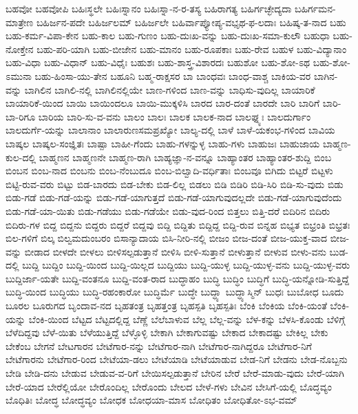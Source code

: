 {ಬಹವೋ
ಬಹವೋಪಿ
ಬಹಿಃಸ್ಥಲೇ
ಬಹಿಃಸ್ನಾನಂ
ಬಹಿಃಸ್ನಾ-ನ-ರ-ತಸ್ಯ
ಬಹಿರಾಗತ್ಯ
ಬಹಿರ್ಗಚ್ಛೇದ್ಯದಾ
ಬಹಿರ್ಗಮನ-ಮಾತ್ರೇಣ
ಬಹಿರ್ಜನ-ಪದೇ
ಬಹಿರ್ಜಲಮ್
ಬಹಿರ್ಜಲೇ
ಬಹಿರ್ವಾಪ್ಯೋಪ್ಯ-ವಭೃಥ-ಫ-ಲದಾಃ
ಬಹಿಷ್ಕ-ತ-ನಾದ
ಬಹು
ಬಹು-ಕರ್ಮ-ವಿಪಾ-ಕೇನ
ಬಹು-ಕಾಲ
ಬಹು-ಗುಣಂ
ಬಹು-ದುಃಖ-ವನ್ನು
ಬಹು-ದುಃಖ-ಸಮಾ-ಕುಲೌ
ಬಹುಧಾ
ಬಹು-ನೋಕ್ತೇನ
ಬಹು-ಪರಿ-ಯಾಗಿ
ಬಹು-ಬೀಜೇನ
ಬಹು-ಮಾನಂ
ಬಹು-ರೂಪಕಾಃ
ಬಹು-ರೇವ
ಬಹುಳ
ಬಹು-ವಿದ್ಯಾನಾಂ
ಬಹು-ವಿಧಾ
ಬಹು-ವಿಧಾನ್
ಬಹು-ವಿಧೈಃ
ಬಹುಶಃ
ಬಹು-ಶಾಸ್ತ್ರ-ವಿಶಾರದಃ
ಬಹುಶೋ
ಬಹು-ಶೋ-ಽಥ
ಬಹು-ಶೋ-ಽಮುನಾ
ಬಹು-ಹಿಂಸಾ-ಯು-ತೇನ
ಬಹೂನಿ
ಬಹ್ಮ-ರಾಕ್ಷಸರ
ಬಾ
ಬಾಂಧವಃ
ಬಾಂಧ-ವಾಶ್ಚ
ಬಾಕಿಯ-ವರ
ಬಾಗಿನ-ವನ್ನು
ಬಾಗಿಲಿನ
ಬಾಗಿಲಿ-ನಲ್ಲಿ
ಬಾಗಿಲಿನಲ್ಲಿಯೇ
ಬಾಣ-ಗಳಿಂದ
ಬಾಣ-ವನ್ನು
ಬಾಧಿಸು-ವುದಿಲ್ಲ
ಬಾಯಾರಿಕೆ
ಬಾಯಾರಿಕೆ-ಯಿಂದ
ಬಾಯಿ
ಬಾಯಿಂದಲೂ
ಬಾಯಿ-ಮುಕ್ಕಳಿಸಿ
ಬಾರದ
ಬಾರ-ದಂತೆ
ಬಾರದೇ
ಬಾರಿ
ಬಾರಿಗೆ
ಬಾರಿ-ಬಾ-ರಿಗೂ
ಬಾರಿಯ
ಬಾರಿ-ಸು-ವ-ವನು
ಬಾಲಂ
ಬಾಲಃ
ಬಾಲಕ
ಬಾಲಕ-ನಾದ
ಬಾಲಘ್ನ್ಯಃ
ಬಾಲದುರ್ಗಾಂ
ಬಾಲದುರ್ಗೆ-ಯನ್ನು
ಬಾಲಾನಾಂ
ಬಾಲಾರುಣಸಮಪ್ರಖ್ಯೋ
ಬಾಲ್ಯ-ದಲ್ಲಿ
ಬಾಳೆ
ಬಾಳೆ-ಯಕಂಭ-ಗಳಿಂದ
ಬಾವಿಯ
ಬಾಷ್ಕಲ
ಬಾಷ್ಕಲ-ಸಂಜ್ಞಿತಃ
ಬಾಷ್ಪಾ
ಬಾಹೀ-ಗೆಂದು
ಬಾಹು-ಗಳನ್ನುಳ್ಳ
ಬಾಹು-ಗಳು
ಬಾಹುಜಃ
ಬಾಹುಜಾಯ
ಬಾಹ್ಮಣ-ಕುಲ-ದಲ್ಲಿ
ಬಾಹ್ಮಣನ
ಬಾಹ್ಮಣನೇ
ಬಾಹ್ಮಣ-ರಾಗಿ
ಬಾಹ್ಯಜ್ಞಾ-ನ-ವನ್ನೂ
ಬಾಹ್ಯಾಂತರ
ಬಾಹ್ಯಾಂತರ-ಶುದ್ದಿ
ಬಿಂಬ
ಬಿಂಬನ
ಬಿಂಬ-ನಾದ
ಬಿಂಬನು
ಬಿಂಬ-ನೆಂಬುದೂ
ಬಿಂಬ-ಬಿಲ್ವಾದಿ-ವರ್ಧಿತಾಃ
ಬಿಂಬವೂ
ಬಿಗಿದು
ಬಿಟ್ಟರೆ
ಬಿಟ್ಟಳು
ಬಿಟ್ಟಿ-ರುವ-ವರು
ಬಿಟ್ಟು
ಬಿಡ-ಬಾರದು
ಬಿಡ-ಬೇಕು
ಬಿಡ-ಲಿಲ್ಲ
ಬಿಡಲು
ಬಿಡಿ
ಬಿಡಿರಿ
ಬಿಡಿ-ಸಿರಿ
ಬಿಡಿ-ಸು-ವುದು
ಬಿಡು
ಬಿಡು-ಗಡೆ
ಬಿಡು-ಗಡೆ-ಯನ್ನು
ಬಿಡು-ಗಡೆ-ಯಾಗುತ್ತದೆ
ಬಿಡು-ಗಡೆ-ಯಾಗುವುದಲ್ಲದೇ
ಬಿಡು-ಗಡೆ-ಯಾಗುವುದೆಂದು
ಬಿಡು-ಗಡೆ-ಯಾ-ಯಿತು
ಬಿಡು-ಗಡೆಯು
ಬಿಡು-ಗಡೆಯೇ
ಬಿಡು-ವುದ-ರಿಂದ
ಬಿತ್ತಲು
ಬಿತ್ತಿ-ದರೆ
ಬಿದಿರಿನ
ಬಿದಿರು
ಬಿದಿರು-ಗಳ
ಬಿದ್ದ
ಬಿದ್ದನು
ಬಿದ್ದರು
ಬಿದ್ದರೆ
ಬಿದ್ದವು
ಬಿದ್ದಿ
ಬಿದ್ದಿತು
ಬಿದ್ದಿದ್ದ
ಬಿದ್ದಿ-ರುವ
ಬಿನ್ನಹ
ಬಿಭ್ಯತ
ಬಿಭ್ರಂತಿ
ಬಿಭ್ರತಃ
ಬಿಲ-ಗಳಿಗೆ
ಬಿಲ್ಕ
ಬಿಲ್ವಮದುಂಬರಂ
ಬಿಸಾನ್ಯಾದಾಯ
ಬಿಸಿ-ನೀರಿ-ನಲ್ಲಿ
ಬೀಜಂ
ಬೀಜ-ದಂತೆ
ಬೀಜ-ಯುಕ್ತ-ವಾದ
ಬೀಜ-ವನ್ನು
ಬೀಡಾದ
ಬೀಳದೇ
ಬೀಳಲು
ಬೀಳಿಸಲ್ಪಡುತ್ತಾನೆ
ಬೀಳಿಸಿ
ಬೀಳಿ-ಸುತ್ತಾನೆ
ಬೀಳುತ್ತಾನೆ
ಬೀಳುವ
ಬೀಳು-ವನು
ಬುಡ-ದಲ್ಲಿ
ಬುದ್ದಿ
ಬುದ್ದಿಂ
ಬುದ್ದಿ-ಯಿಂದ
ಬುದ್ದಿ-ಯಿಲ್ಲದ
ಬುದ್ದಿಯು
ಬುದ್ದಿ-ಯುಳ್ಳ
ಬುದ್ದಿ-ಯುಳ್ಳ-ವನು
ಬುದ್ದಿ-ಯುಳ್ಳ-ವರು
ಬುದ್ದಿರ್ಜಾ-ಯತೇ
ಬುದ್ದಿ-ವಂತನೂ
ಬುದ್ದಿ-ವಂತ-ರಾದ
ಬುದ್ಧಾಹಂ
ಬುದ್ಧಿ
ಬುದ್ಧಿಂ
ಬುದ್ಧಿಗೆ
ಬುದ್ಧಿ-ಯನ್ನೋಡಿ-ಸುತ್ತಿದ್ದೆ
ಬುದ್ಧಿ-ಯಿಂದ
ಬುದ್ಧಿಯು
ಬುದ್ಧಿ-ರಹಂಕಾರೋ
ಬುದ್ಧಿರ್ಮೆ
ಬುದ್ಧೇ
ಬುದ್ಧ್ಯಾ
ಬುದ್ಧ್ಯಾಸ್ಮಿನ್
ಬುಧಃ
ಬುಬೋಧ
ಬೂದು
ಬೂರಲ
ಬೂರುಗದ
ಬೃಂದಾವ-ನದ
ಬೃಹತಂತ್ರ
ಬೃಹತ್ತಂತ್ರ
ಬೃಹಸ್ಪತಿ
ಬೃಹಸ್ಪತಿಃ
ಬೆಂಕಿ
ಬೆಂಕಿಯ
ಬೆಂಕಿ-ಯಂತೆ
ಬೆಂಕಿ-ಯನ್ನು
ಬೆಂಕಿ-ಯಿಂದ
ಬೆಟ್ಟದ
ಬೆಟ್ಟದಲ್ಲಿದ್ದ
ಬೆಣ್ಣೆ
ಬೆಲೆಬಾಳುವ
ಬೆಲ್ಲ
ಬೆಲ್ಲ-ವನ್ನು
ಬೆಳ-ಕನ್ನು
ಬೆಳಸಿ-ಕೊಂಡು
ಬೆಳಿಗ್ಗೆ
ಬೆಳೆದಿದ್ದವು
ಬೆಳೆ-ಯಿತು
ಬೆಳೆಯುತ್ತಿದ್ದೆ
ಬೆಳ್ಳೊಳ್ಳಿ
ಬೇಕಾಗಿ
ಬೇಕಾಗುವಷ್ಟು
ಬೇಕಾದ
ಬೇಕಾದಷ್ಟು
ಬೇಕಿಲ್ಲ
ಬೇಕು
ಬೇಕೆಂಬ
ಬೇಗನೆ
ಬೇಟಗಾರನ
ಬೇಟೆಗಾರ-ನನ್ನು
ಬೇಟೆಗಾರ-ನಾಗಿ
ಬೇಟೆಗಾರ-ನಾಗಿದ್ದರೂ
ಬೇಟೆಗಾರ-ನಿಗೆ
ಬೇಟೆಗಾರನು
ಬೇಟೆಗಾರ-ರಿಂದ
ಬೇಟೆಯಾ-ಡಲು
ಬೇಟೆಯಾಡಿ
ಬೇಟೆಯಾಡುವ
ಬೇಡ-ನಿಗೆ
ಬೇಡನು
ಬೇಡ-ನೊಬ್ಬನು
ಬೇಡಿ
ಬೇಡಿ-ದನು
ಬೇಡುವ
ಬೇಡುವ-ವ-ರಿಗೆ
ಬೇಯಿಸಲ್ಪಡುತ್ತಾನೆ
ಬೇರಿನ
ಬೇರೆ
ಬೇರೆ-ಮಾಡು-ವುದು
ಬೇರೆ-ಯಾಗಿ
ಬೇರೆ-ಯಾದ
ಬೇರೆಲ್ಲಿಯೋ
ಬೇರೊಂದಿಲ್ಲ
ಬೇರೊಂದು
ಬೇಲದ
ಬೇಳೆ-ಗಳು
ಬೇವಿನ
ಬೇಸಿಗೆ-ಯಲ್ಲಿ
ಬೊದ್ಧವ್ಯಂ
ಬೊಧಿತಿಃ
ಬೋದ್ಧ
ಬೋದ್ಧವ್ಯಂ
ಬೋಧಕ
ಬೋಧಯಾ-ಮಾಸ
ಬೋಧಿತಂ
ಬೋಧಿತೋ-ಽಭ-ವಮ್
}
